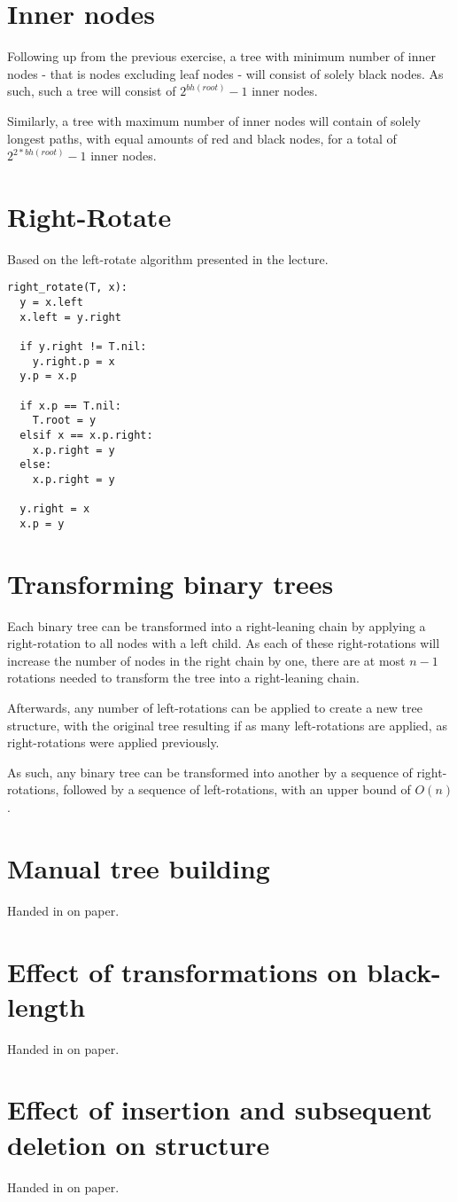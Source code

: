 \documentclass[a4paper]{scrartcl}
\begin{document}
\section{Inner nodes}

Following up from the previous exercise, a tree with minimum number of inner
nodes - that is nodes excluding leaf nodes - will consist of solely black
nodes. As such, such a tree will consist of $2^{bh(root)} - 1$ inner nodes.

Similarly, a tree with maximum number of inner nodes will contain of solely
longest paths, with equal amounts of red and black nodes, for a total of $2^{2
* bh(root)} - 1$ inner nodes.

\section{Right-Rotate}

Based on the left-rotate algorithm presented in the lecture.

\begin{lstlisting}
right_rotate(T, x):
  y = x.left
  x.left = y.right

  if y.right != T.nil:
    y.right.p = x
  y.p = x.p

  if x.p == T.nil:
    T.root = y
  elsif x == x.p.right:
    x.p.right = y
  else:
    x.p.right = y

  y.right = x
  x.p = y
\end{lstlisting}

\section{Transforming binary trees}

Each binary tree can be transformed into a right-leaning chain by applying a
right-rotation to all nodes with a left child. As each of these right-rotations
will increase the number of nodes in the right chain by one, there are at most
$n-1$ rotations needed to transform the tree into a right-leaning chain.

Afterwards, any number of left-rotations can be applied to create a new tree
structure, with the original tree resulting if as many left-rotations are
applied, as right-rotations were applied previously.

As such, any binary tree can be transformed into another by a sequence of
right-rotations, followed by a sequence of left-rotations, with an upper bound
of $O(n)$.

\section{Manual tree building}

Handed in on paper.

\section{Effect of transformations on black-length}

Handed in on paper.

\section{Effect of insertion and subsequent deletion on structure}

Handed in on paper.
\end{document}
